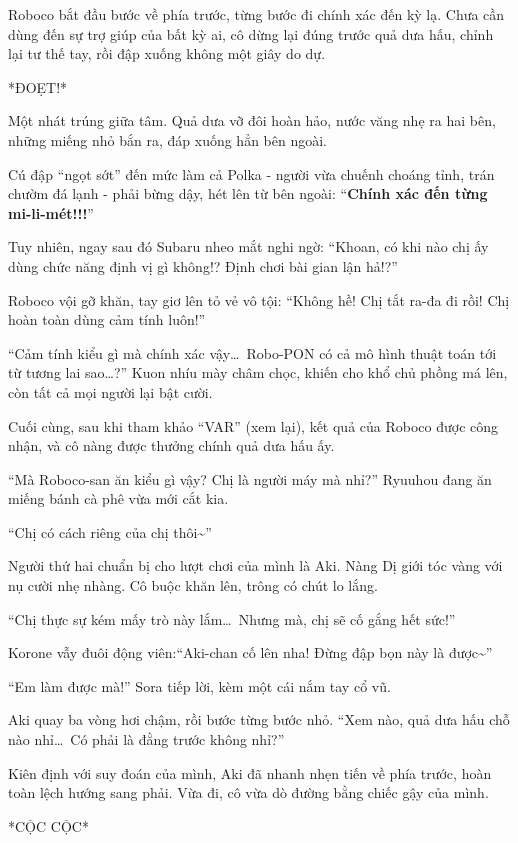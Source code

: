 \documentclass[../main.tex]{subfiles}
\begin{document}
Roboco bắt đầu bước về phía trước, từng bước đi chính xác đến kỳ lạ. Chưa cần dùng đến sự trợ giúp của bất kỳ ai, cô dừng lại đúng trước quả dưa hấu, chỉnh lại tư thế tay, rồi đập xuống không một giây do dự.

*ĐOẸT!*

Một nhát trúng giữa tâm. Quả dưa vỡ đôi hoàn hảo, nước văng nhẹ ra hai bên, những miếng nhỏ bắn ra, đáp xuống hẳn bên ngoài.

Cú đập ``ngọt sớt'' đến mức làm cả Polka - người vừa chuếnh choáng tỉnh, trán chườm đá lạnh - phải bừng dậy, hét lên từ bên ngoài: ``\textbf{Chính xác đến từng mi-li-mét!!!}''

Tuy nhiên, ngay sau đó Subaru nheo mắt nghi ngờ: ``Khoan, có khi nào chị ấy dùng chức năng định vị gì không!? Định chơi bài gian lận hả!?''

Roboco vội gỡ khăn, tay giơ lên tỏ vẻ vô tội: ``Không hề! Chị tắt ra-đa đi rồi! Chị hoàn toàn dùng cảm tính luôn!''

``Cảm tính kiểu gì mà chính xác vậy\dots\ Robo-PON có cả mô hình thuật toán tới từ tương lai sao\dots?'' Kuon nhíu mày châm chọc, khiến cho khổ chủ phồng má lên, còn tất cả mọi người lại bật cười.

Cuối cùng, sau khi tham khảo ``VAR'' (xem lại), kết quả của Roboco được công nhận, và cô nàng được thưởng chính quả dưa hấu ấy.

``Mà Roboco-san ăn kiểu gì vậy? Chị là người máy mà nhỉ?'' Ryuuhou đang ăn miếng bánh cà phê vừa mới cắt kia.

``Chị có cách riêng của chị thôi\~{}''

\ct

Người thứ hai chuẩn bị cho lượt chơi của mình là Aki. Nàng Dị giới tóc vàng với nụ cười nhẹ nhàng. Cô buộc khăn lên, trông có chút lo lắng.

``Chị thực sự kém mấy trò này lắm\dots\ Nhưng mà, chị sẽ cố gắng hết sức!''

Korone vẫy đuôi động viên:``Aki-chan cố lên nha! Đừng đập bọn này là được\~{}''

``Em làm được mà!'' Sora tiếp lời, kèm một cái nắm tay cổ vũ.

Aki quay ba vòng hơi chậm, rồi bước từng bước nhỏ. ``Xem nào, quả dưa hấu chỗ nào nhỉ\dots\ Có phải là đằng trước không nhỉ?''

Kiên định với suy đoán của mình, Aki đã nhanh nhẹn tiến về phía trước, hoàn toàn lệch hướng sang phải. Vừa đi, cô vừa dò đường bằng chiếc gậy của mình.

*CỘC CỘC*
\end{document}
